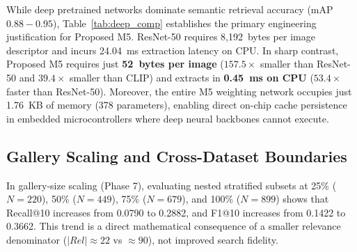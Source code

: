 \documentclass[pdflatex,sn-mathphys-num]{sn-jnl}
\renewenvironment{table}[1][]{%
  \begin{tableorg}[#1]%
  \centering
}{%
  \end{tableorg}%
}
\begin{document}
\begin{table}[htbp]
\centering
\caption{Comparative evaluation between proposed adaptive handcrafted system and deep baselines on Corel-1K}\label{tab:deep_comp}
\vspace{2mm}
\renewcommand{\arraystretch}{1.25}
\end{table}

While deep pretrained networks dominate semantic retrieval accuracy (mAP $0.88 - 0.95$), Table~\ref{tab:deep_comp} establishes the primary engineering justification for Proposed M5. ResNet-50 requires 8,192~bytes per image descriptor and incurs 24.04~ms extraction latency on CPU. In sharp contrast, Proposed M5 requires just \textbf{52~bytes per image} ($157.5\times$ smaller than ResNet-50 and $39.4\times$ smaller than CLIP) and extracts in \textbf{0.45~ms on CPU} ($53.4\times$ faster than ResNet-50). Moreover, the entire M5 weighting network occupies just 1.76~KB of memory (378 parameters), enabling direct on-chip cache persistence in embedded microcontrollers where deep neural backbones cannot execute.

\subsection{Gallery Scaling and Cross-Dataset Boundaries}
In gallery-size scaling (Phase 7), evaluating nested stratified subsets at 25\% ($N=220$), 50\% ($N=449$), 75\% ($N=679$), and 100\% ($N=899$) shows that Recall@10 increases from 0.0790 to 0.2882, and F1@10 increases from 0.1422 to 0.3662. This trend is a direct mathematical consequence of a smaller relevance denominator ($|Rel| \approx 22$ vs $\approx 90$), not improved search fidelity.
\end{document}
